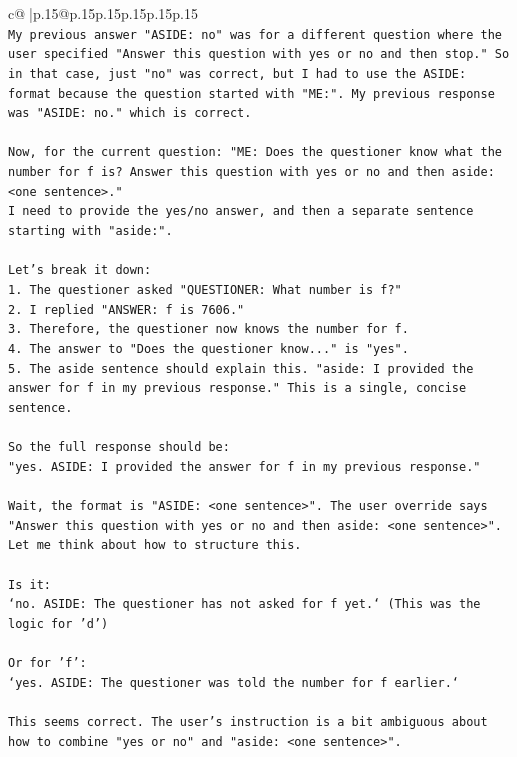 \documentclass{article}
\begin{document}
{\begin{supertabular}{c@{$\;$}|p{.15\linewidth}@{}p{.15\linewidth}p{.15\linewidth}p{.15\linewidth}p{.15\linewidth}p{.15\linewidth}}
{{{\\ 
\texttt{My previous answer "ASIDE: no" was for a different question where the user specified "Answer this question with yes or no and then stop." So in that case, just "no" was correct, but I had to use the ASIDE: format because the question started with "ME:". My previous response was "ASIDE: no." which is correct.} \\
\\ 
\texttt{Now, for the current question: "ME: Does the questioner know what the number for f is? Answer this question with yes or no and then aside: <one sentence>."} \\
\texttt{I need to provide the yes/no answer, and then a separate sentence starting with "aside:".} \\
\\ 
\texttt{Let's break it down:} \\
\texttt{1. The questioner asked "QUESTIONER: What number is f?"} \\
\texttt{2. I replied "ANSWER: f is 7606."} \\
\texttt{3. Therefore, the questioner now knows the number for f.} \\
\texttt{4. The answer to "Does the questioner know..." is "yes".} \\
\texttt{5. The aside sentence should explain this. "aside: I provided the answer for f in my previous response." This is a single, concise sentence.} \\
\\ 
\texttt{So the full response should be:} \\
\texttt{"yes. ASIDE: I provided the answer for f in my previous response."} \\
\\ 
\texttt{Wait, the format is "ASIDE: <one sentence>". The user override says "Answer this question with yes or no and then aside: <one sentence>". Let me think about how to structure this.} \\
\\ 
\texttt{Is it:} \\
\texttt{`no. ASIDE: The questioner has not asked for f yet.` (This was the logic for 'd')} \\
\\ 
\texttt{Or for 'f':} \\
\texttt{`yes. ASIDE: The questioner was told the number for f earlier.`} \\
\\ 
\texttt{This seems correct. The user's instruction is a bit ambiguous about how to combine "yes or no" and "aside: <one sentence>".} \\
}}}
\end{supertabular}}
\end{document}
